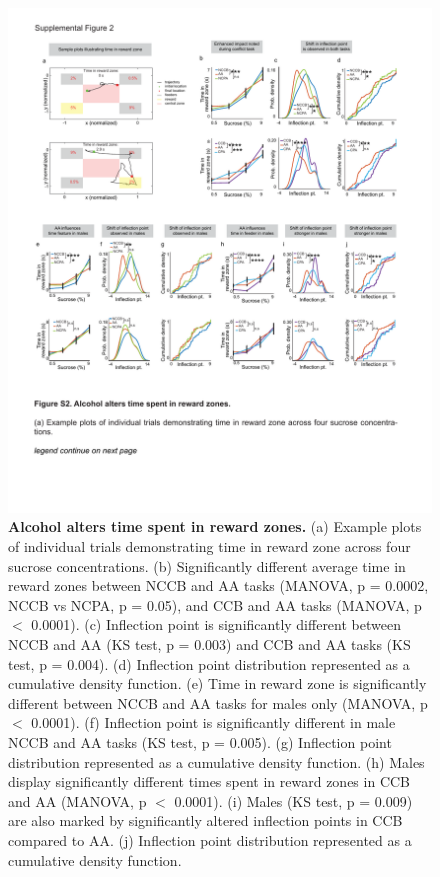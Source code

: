 \documentclass{article}
\newcounter{suppfig}
\renewcommand{\thesuppfig}{S\arabic{suppfig}}  %
\newenvironment{suppfigure}[1][htbp]
  {\refstepcounter{suppfig}%
   \begin{figure}[#1]%
   \renewcommand{\thefigure}{\thesuppfig}}%
  {\end{figure}}
\begin{document}
\begin{suppfigure}
  \centering
  \includegraphics[width=\textwidth, trim=50 100 50 100]{Figs/Alcohol_SI_2.pdf}
  \caption{\textbf{Alcohol alters time spent in reward zones.} (a) Example plots of individual trials demonstrating time in reward zone across four sucrose concentrations. (b) Significantly different average time in reward zones between NCCB and AA tasks (MANOVA, p = 0.0002, NCCB vs NCPA, p = 0.05), and CCB and AA tasks (MANOVA, p $<$ 0.0001). (c) Inflection point is significantly different between NCCB and AA (KS test, p = 0.003) and CCB and AA tasks (KS test, p = 0.004). (d) Inflection point distribution represented as a cumulative density function. (e) Time in reward zone is significantly different between NCCB and AA tasks for males only (MANOVA, p $<$ 0.0001). (f) Inflection point is significantly different in male NCCB and AA tasks (KS test, p = 0.005). (g) Inflection point distribution represented as a cumulative density function. (h) Males display significantly different times spent in reward zones in CCB and AA (MANOVA, p $<$ 0.0001). (i) Males (KS test, p = 0.009) are also marked by significantly altered inflection points in CCB compared to AA. (j) Inflection point distribution represented as a cumulative density function.}
  \label{fig:Alcohol_SI_2}
\end{suppfigure}
\end{document}
